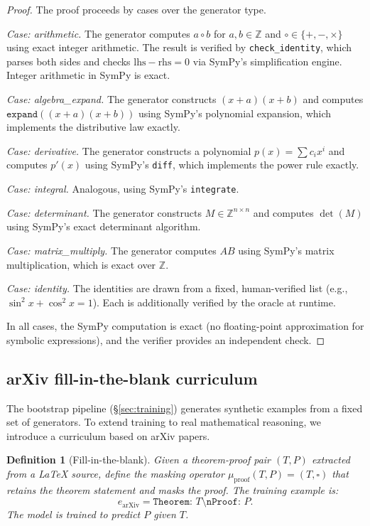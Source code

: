 \documentclass[11pt,a4paper]{article}
\newtheorem{definition}[theorem]{Definition}
\newcommand{\Z}{\mathbb{Z}}
\begin{document}
\begin{proof}
The proof proceeds by cases over the generator type.

\emph{Case: arithmetic.}
The generator computes $a \circ b$ for $a, b \in \Z$ and
$\circ \in \{+, -, \times\}$ using exact integer arithmetic.
The result is verified by \texttt{check\_identity}, which
parses both sides and checks $\text{lhs} - \text{rhs} = 0$
via SymPy's simplification engine.
Integer arithmetic in SymPy is exact.

\emph{Case: algebra\_expand.}
The generator constructs $(x + a)(x + b)$ and computes
$\texttt{expand}((x+a)(x+b))$ using SymPy's polynomial
expansion, which implements the distributive law exactly.

\emph{Case: derivative.}
The generator constructs a polynomial $p(x) = \sum c_i x^i$
and computes $p'(x)$ using SymPy's \texttt{diff}, which
implements the power rule exactly.

\emph{Case: integral.}
Analogous, using SymPy's \texttt{integrate}.

\emph{Case: determinant.}
The generator constructs $M \in \Z^{n \times n}$ and computes
$\det(M)$ using SymPy's exact determinant algorithm.

\emph{Case: matrix\_multiply.}
The generator computes $AB$ using SymPy's matrix multiplication,
which is exact over $\Z$.

\emph{Case: identity.}
The identities are drawn from a fixed, human-verified list
(e.g., $\sin^2 x + \cos^2 x = 1$).
Each is additionally verified by the oracle at runtime.

In all cases, the SymPy computation is exact (no floating-point
approximation for symbolic expressions), and the verifier
provides an independent check.
\end{proof}

\subsection{arXiv fill-in-the-blank curriculum}\label{sec:arxiv-curriculum}

The bootstrap pipeline (\S\ref{sec:training}) generates synthetic
examples from a fixed set of generators.
To extend training to real mathematical reasoning, we introduce
a curriculum based on arXiv papers.

\begin{definition}[Fill-in-the-blank]\label{def:fitb}
Given a theorem-proof pair $(T, P)$ extracted from a LaTeX source,
define the masking operator $\mu_{\text{proof}}(T, P) = (T, \square)$
that retains the theorem statement and masks the proof.
The training example is:
\[
e_{\text{arXiv}} = \texttt{Theorem: } T \texttt{\textbackslash nProof: } P.
\]
The model is trained to predict $P$ given $T$.
\end{definition}
\end{document}
